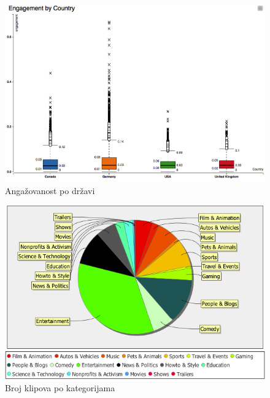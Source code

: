 \documentclass[a4paper]{article}
\theoremstyle{definition}
\begin{document}
\begin{figure}[h!]
\begin{center}
    \includegraphics[width=1\textwidth]{engagement_box_plot.png}
    \caption{Angažovanost po državi}
        \label{fig:boxEngagement}
\end{center}
\end{figure}


\begin{figure}[h!]
\begin{center}
    \includegraphics[width=1\textwidth]{categories_clips.png}
    \caption{Broj klipova po kategorijama}
    \label{fig:brojKlipova}
\end{center}
\end{figure}
\end{document}
